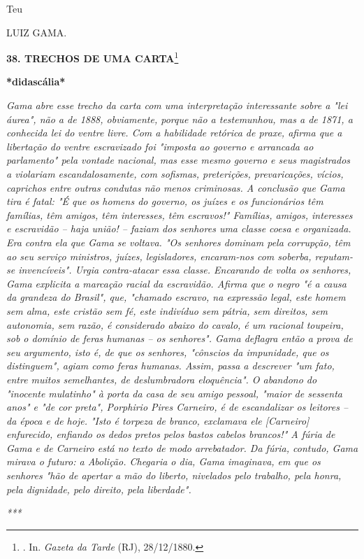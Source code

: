 Teu

LUIZ GAMA.

\textbf{38. TRECHOS DE UMA CARTA}\footnote{. In. \emph{Gazeta da Tarde}
  (RJ), 28/12/1880.}

\textbf{*didascália*}

\emph{Gama abre esse trecho da carta com uma interpretação interessante
sobre a "lei áurea", não a de 1888, obviamente, porque não a
testemunhou, mas a de 1871, a conhecida lei do ventre livre. Com a
habilidade retórica de praxe, afirma que a libertação do ventre
escravizado foi "imposta ao governo e arrancada ao parlamento" pela
vontade nacional, mas esse mesmo governo e seus magistrados a violariam
escandalosamente, com sofismas, preterições, prevaricações, vícios,
caprichos entre outras condutas não menos criminosas. A conclusão que
Gama tira é fatal: "É que os homens do governo, os juízes e os
funcionários têm famílias, têm amigos, têm interesses, têm escravos!"
Famílias, amigos, interesses e escravidão -- haja união! -- faziam dos
senhores uma classe coesa e organizada. Era contra ela que Gama se
voltava. "Os senhores dominam pela corrupção, têm ao seu serviço
ministros, juízes, legisladores, encaram-nos com soberba, reputam-se
invencíveis". Urgia contra-atacar essa classe. Encarando de volta os
senhores, Gama explicita a marcação racial da escravidão. Afirma que o
negro "é a causa da grandeza do Brasil", que, "chamado escravo, na
expressão legal, este homem sem alma, este cristão sem fé, este
indivíduo sem pátria, sem direitos, sem autonomia, sem razão, é
considerado abaixo do cavalo, é um racional toupeira, sob o domínio de
feras humanas -- os senhores". Gama deflagra então a prova de seu
argumento, isto é, de que os senhores, "cônscios da impunidade, que os
distinguem", agiam como feras humanas. Assim, passa a descrever "um
fato, entre muitos semelhantes, de deslumbradora eloquência". O abandono
do "inocente mulatinho" à porta da casa de seu amigo pessoal, "maior de
sessenta anos" e "de cor preta", Porphirio Pires Carneiro, é de
escandalizar os leitores -- da época e de hoje. "Isto é torpeza de
branco, exclamava ele {[}Carneiro{]} enfurecido, enfiando os dedos
pretos pelos bastos cabelos brancos!" A fúria de Gama e de Carneiro está
no texto de modo arrebatador. Da fúria, contudo, Gama mirava o futuro: a
Abolição. Chegaria o dia, Gama imaginava, em que os senhores "hão de
apertar a mão do liberto, nivelados pelo trabalho, pela honra, pela
dignidade, pelo direito, pela liberdade". }

\emph{***}


